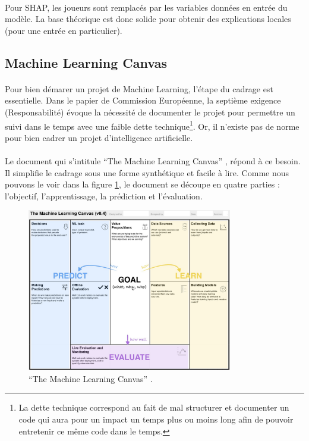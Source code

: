\documentclass[10pt, french, a4paper]{report}
\begin{document}
\paragraph{}
Pour SHAP, les joueurs sont remplacés par les variables données en entrée du modèle. La base théorique est donc solide pour obtenir des explications locales (pour une entrée en particulier). 


\subsection{Machine Learning Canvas}

\paragraph{}
Pour bien démarer un projet de Machine Learning, l'étape du cadrage est essentielle. Dans le papier de Commission Européenne, la septième exigence (Responsabilité) évoque la nécessité de documenter le projet pour permettre un suivi dans le temps avec une faible dette technique\footnote{La dette technique correspond au fait de mal structurer et documenter un code qui aura pour un impact un temps plus ou moins long afin de pouvoir entretenir ce même code dans le temps.}. Or, il n'existe pas de norme pour bien cadrer un projet d'intelligence artificielle.

\paragraph{}
Le document qui s'intitule ``The Machine Learning Canvas'' \citep{dorad_machine_2016}, répond à ce besoin. Il simplifie le cadrage sous une forme synthétique et facile à lire. Comme nous pouvons le voir dans la figure \ref{fig:ml_canvas}, le document se découpe en quatre parties : l'objectif, l'apprentissage, la prédiction et l'évaluation.

\begin{figure}[hbt!]
  \centering
  \includegraphics[width=0.8\textwidth]{images/ml_canvas.jpeg}
  \caption{``The Machine Learning Canvas'' \cite{dorad_machine_2016}.}
  \label{fig:ml_canvas}
\end{figure}
\end{document}
